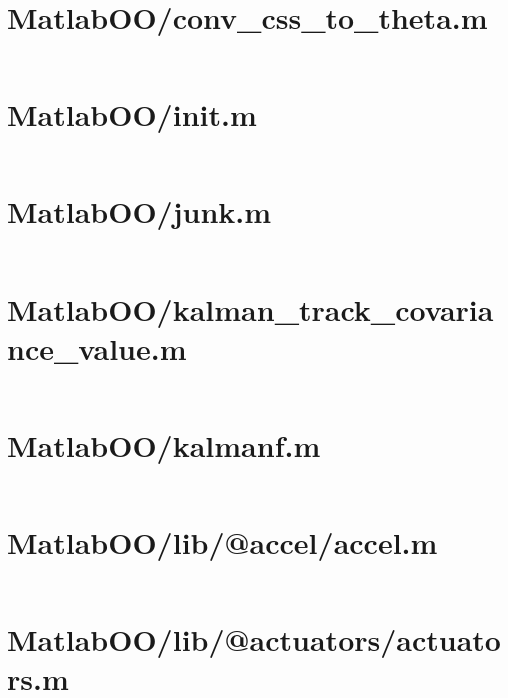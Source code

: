 \pagebreak
\section*{MatlabOO/conv\_css\_to\_theta.m}\label{code:MatlabOO/conv_css_to_theta.m}
\inputminted[linenos,fontsize=\scriptsize]{matlab}{/home/dcouture/git/mathyourlife/TSatPy/beta_versions/matlab_object_oriented/conv_css_to_theta.m}

\pagebreak
\section*{MatlabOO/init.m}\label{code:MatlabOO/init.m}
\inputminted[linenos,fontsize=\scriptsize]{matlab}{/home/dcouture/git/mathyourlife/TSatPy/beta_versions/matlab_object_oriented/init.m}

\pagebreak
\section*{MatlabOO/junk.m}\label{code:MatlabOO/junk.m}
\inputminted[linenos,fontsize=\scriptsize]{matlab}{/home/dcouture/git/mathyourlife/TSatPy/beta_versions/matlab_object_oriented/junk.m}

\pagebreak
\section*{MatlabOO/kalman\_track\_covariance\_value.m}\label{code:MatlabOO/kalman_track_covariance_value.m}
\inputminted[linenos,fontsize=\scriptsize]{matlab}{/home/dcouture/git/mathyourlife/TSatPy/beta_versions/matlab_object_oriented/kalman_track_covariance_value.m}

\pagebreak
\section*{MatlabOO/kalmanf.m}\label{code:MatlabOO/kalmanf.m}
\inputminted[linenos,fontsize=\scriptsize]{matlab}{/home/dcouture/git/mathyourlife/TSatPy/beta_versions/matlab_object_oriented/kalmanf.m}

\pagebreak
\section*{MatlabOO/lib/@accel/accel.m}\label{code:MatlabOO/lib/@accel/accel.m}
\inputminted[linenos,fontsize=\scriptsize]{matlab}{/home/dcouture/git/mathyourlife/TSatPy/beta_versions/matlab_object_oriented/lib/@accel/accel.m}

\pagebreak
\section*{MatlabOO/lib/@actuators/actuators.m}\label{code:MatlabOO/lib/@actuators/actuators.m}
\inputminted[linenos,fontsize=\scriptsize]{matlab}{/home/dcouture/git/mathyourlife/TSatPy/beta_versions/matlab_object_oriented/lib/@actuators/actuators.m}

